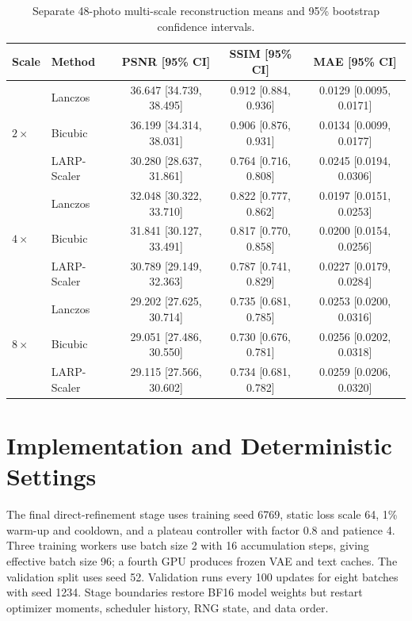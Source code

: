 \documentclass[10pt]{article}
\newcommand{\method}{LARP-Scaler\xspace}
\begin{document}
\begin{table}[H]
  \centering
  \caption{Separate 48-photo multi-scale reconstruction means and 95\%
  bootstrap confidence intervals.}
  \label{tab:multiscale_ci}
  \scriptsize
  \setlength{\tabcolsep}{4pt}
  \begin{tabular}{llccc}
    \toprule
    Scale & Method & PSNR [95\% CI] & SSIM [95\% CI] & MAE [95\% CI]\\
    \midrule
    \multirow{3}{*}{$2\times$}
      & Lanczos & 36.647 [34.739, 38.495] & 0.912 [0.884, 0.936] & 0.0129 [0.0095, 0.0171]\\
      & Bicubic & 36.199 [34.314, 38.031] & 0.906 [0.876, 0.931] & 0.0134 [0.0099, 0.0177]\\
      & \method & 30.280 [28.637, 31.861] & 0.764 [0.716, 0.808] & 0.0245 [0.0194, 0.0306]\\
    \midrule
    \multirow{3}{*}{$4\times$}
      & Lanczos & 32.048 [30.322, 33.710] & 0.822 [0.777, 0.862] & 0.0197 [0.0151, 0.0253]\\
      & Bicubic & 31.841 [30.127, 33.491] & 0.817 [0.770, 0.858] & 0.0200 [0.0154, 0.0256]\\
      & \method & 30.789 [29.149, 32.363] & 0.787 [0.741, 0.829] & 0.0227 [0.0179, 0.0284]\\
    \midrule
    \multirow{3}{*}{$8\times$}
      & Lanczos & 29.202 [27.625, 30.714] & 0.735 [0.681, 0.785] & 0.0253 [0.0200, 0.0316]\\
      & Bicubic & 29.051 [27.486, 30.550] & 0.730 [0.676, 0.781] & 0.0256 [0.0202, 0.0318]\\
      & \method & 29.115 [27.566, 30.602] & 0.734 [0.681, 0.782] & 0.0259 [0.0206, 0.0320]\\
    \bottomrule
  \end{tabular}
\end{table}

\section{Implementation and Deterministic Settings}
\label{app:implementation}

The final direct-refinement stage uses training seed 6769, static loss scale
64, 1\% warm-up and cooldown, and a plateau controller with factor 0.8 and
patience 4. Three training workers use batch size 2 with 16 accumulation steps,
giving effective batch size 96; a fourth GPU produces frozen VAE and text
caches. The validation split uses seed 52. Validation runs every 100 updates
for eight batches with seed 1234. Stage boundaries restore BF16 model weights
but restart optimizer moments, scheduler history, RNG state, and data order.
\end{document}
